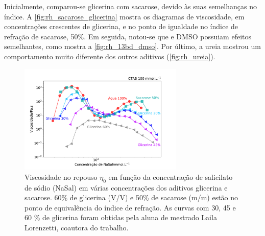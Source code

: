 			Inicialmente, comparou-se glicerina com sacarose, devido às suas semelhanças no índice. A \autoref{fig:rh_sacarose_glicerina} mostra os diagramas de viscosidade, em concentrações crescentes de glicerina, e no ponto de igualdade no índice de refração de sacarose, 50\%. Em seguida, notou-se que \BD{} e DMSO possuiam efeitos semelhantes, como mostra a \autoref{fig:rh_13bd_dmso}. Por último, a ureia mostrou um comportamento muito diferente dos outros aditivos (\autoref{fig:rh_ureia}).
			
			\begin{figure}[htb]
				\centering
				\includegraphics[width=0.7\textwidth]{imagens/reologia/RH_sacarose_glicerina}
				\caption{Viscosidade no repouso \(\eta_0\) em função da concentração de salicilato de sódio (NaSal) em várias concentrações dos aditivos glicerina e sacarose. 60\% de glicerina (V/V) e 50\% de sacarose (m/m) estão no ponto de equivalência do índice de refração. As curvas com 30, 45 e 60 \% de glicerina foram obtidas pela aluna de mestrado Laila Lorenzetti, coautora do trabalho.}
				\label{fig:rh_sacarose_glicerina}
			\end{figure}   
			

